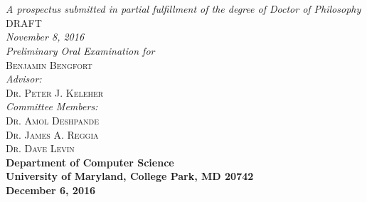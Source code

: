 \documentclass{article}
\begin{document}
\begin{titlepage}
\begin{center}

\textsc{\huge \bfseries {}}\\
\textsc{\huge \bfseries {}}\\[1.0cm]

\emph{A prospectus submitted in partial fulfillment of the degree of Doctor of
Philosophy}\\[5.5cm]

\textsc{\large DRAFT}\\
\emph{November 8, 2016}\\[2.0cm]

\emph{Preliminary Oral Examination for}\\
\textsc{\large Benjamin Bengfort}\\[2.0cm] %
\emph{Advisor:} \\
\textsc{Dr. Peter J. Keleher}\\[.5cm]
\emph{Committee Members:}\\
\textsc{Dr. Amol Deshpande}\\
\textsc{Dr. James A. Reggia}\\
\textsc{Dr. Dave Levin}\\[4.0cm]

{\bfseries Department of Computer Science}\\
{\bfseries University of Maryland, College Park, MD 20742}\\
{\bfseries December 6, 2016}
\vfill

\end{center}

\end{titlepage}

\newpage
\thispagestyle{empty}
\mbox{}
\end{document}
